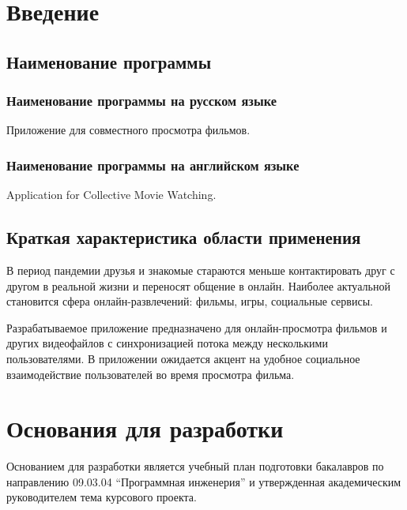 \section{Введение}

\subsection{Наименование программы}

\subsubsection{Наименование программы на русском языке}

Приложение для совместного просмотра фильмов.

\subsubsection{Наименование программы на английском языке}

Application for Collective Movie Watching.

\subsection{Краткая характеристика области применения}

В период пандемии друзья и знакомые стараются меньше контактировать друг с другом в реальной жизни и переносят общение в онлайн.
Наиболее актуальной становится сфера онлайн-развлечений: фильмы, игры, социальные сервисы.

Разрабатываемое приложение предназначено для онлайн-просмотра фильмов и других видеофайлов с синхронизацией потока
между несколькими пользователями.
В приложении ожидается акцент на удобное социальное взаимодействие пользователей во время просмотра фильма.

\section{Основания для разработки}

Основанием для разработки является учебный план подготовки бакалавров по направлению 09.03.04 ``Программная инженерия'' и утвержденная академическим руководителем тема курсового проекта.